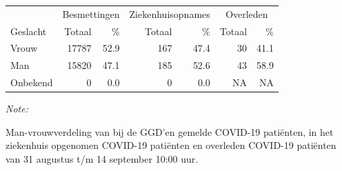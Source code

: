 \documentclass[
  english,
  man,floatsintext]{apa6}
\begin{document}
\begin{table}
\centering\begingroup\fontsize{11}{13}\selectfont

\begin{threeparttable}
\begin{tabular}{lrrrrrr}
\toprule
\multicolumn{1}{c}{ } & \multicolumn{2}{c}{Besmettingen} & \multicolumn{2}{c}{Ziekenhuisopnames} & \multicolumn{2}{c}{Overleden} \\
\cmidrule(l{3pt}r{3pt}){2-3} \cmidrule(l{3pt}r{3pt}){4-5} \cmidrule(l{3pt}r{3pt}){6-7}
Geslacht & Totaal & \% & Totaal & \% & Totaal & \%\\
\midrule
Vrouw & 17787 & 52.9 & 167 & 47.4 & 30 & 41.1\\
Man & 15820 & 47.1 & 185 & 52.6 & 43 & 58.9\\
Onbekend & 0 & 0.0 & 0 & 0.0 & NA & NA\\
\bottomrule
\end{tabular}
\begin{tablenotes}
\item \textit{Note: } 
\item Man-vrouwverdeling van bij de GGD’en gemelde COVID-19 patiënten, in het ziekenhuis opgenomen COVID-19 patiënten en overleden COVID-19 patiënten van 31 augustus t/m 14 september 10:00 uur.
\end{tablenotes}
\end{threeparttable}
\endgroup{}
\end{table}
\newpage
\end{document}
